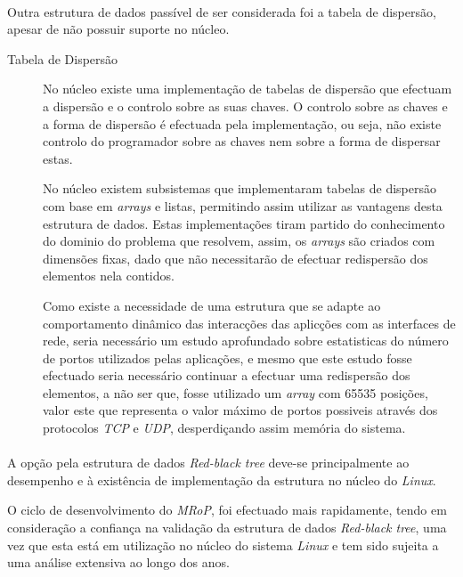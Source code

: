 \paragraph*{}
Outra estrutura de dados passível de ser considerada foi a tabela de dispersão, apesar de não possuir suporte no núcleo.

\begin{description}
\item[Tabela de Dispersão]
No núcleo existe uma implementação de tabelas de dispersão que efectuam a dispersão e o controlo sobre as suas chaves.
O controlo sobre as chaves e a forma de dispersão é efectuada pela implementação, ou seja, não existe controlo do programador sobre as chaves nem sobre a forma de dispersar estas.

No núcleo existem subsistemas que implementaram tabelas de dispersão com base em \textit{arrays} e listas, permitindo assim utilizar as vantagens desta estrutura de dados.
Estas implementações tiram partido do conhecimento do dominio do problema que resolvem, assim, os \textit{arrays} são criados com dimensões fixas, dado que não necessitarão de efectuar redispersão dos elementos nela contidos.

Como existe a necessidade de uma estrutura que se adapte ao comportamento dinâmico das interacções das aplicções com as interfaces de rede, seria necessário um estudo aprofundado sobre estatisticas do número de portos utilizados pelas aplicações, e mesmo que este estudo fosse efectuado seria necessário continuar a efectuar uma redispersão dos elementos, a não ser que, fosse utilizado um \textit{array} com 65535 posições, valor este que representa o valor máximo de portos possiveis através dos protocolos \textit{TCP} e \textit{UDP}, desperdiçando assim memória do sistema.


\end{description}
\paragraph*{}
A opção pela estrutura de dados \textit{Red-black tree} deve-se principalmente ao desempenho e à existência de implementação da estrutura no núcleo do \textit{Linux}.

O ciclo de desenvolvimento do \textit{MRoP}, foi efectuado mais rapidamente, tendo em consideração a confiança na validação da estrutura de dados \textit{Red-black tree}, uma vez que esta está em utilização no núcleo do sistema \textit{Linux} e tem sido sujeita a uma análise extensiva ao longo dos anos.
 
